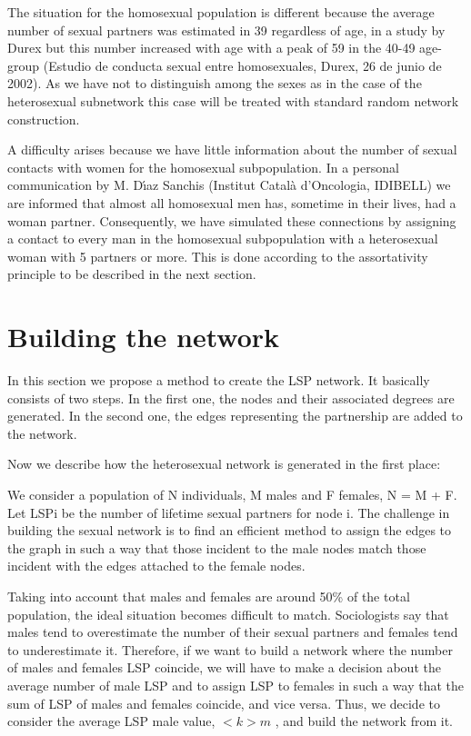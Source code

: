 The situation for the homosexual population is different because the average number of sexual partners was estimated in 39 regardless of age, in a study by Durex but this number increased with age with a peak of 59 in the 40-49 age-group (Estudio de conducta sexual entre homosexuales, Durex, 26 de junio de 2002).  As we have not to distinguish among the sexes as in the case of the heterosexual subnetwork this case will be treated with standard random network construction.

A difficulty arises because we have little information about the number of sexual contacts with women for the homosexual subpopulation. In a personal communication by M. D\'{\i}az Sanchis (Institut Catal\`{a} d'Oncologia, IDIBELL) we are informed that almost all homosexual men has, sometime in their lives, had a woman partner.  Consequently, we have simulated these connections by assigning a contact to every man in the homosexual subpopulation with a heterosexual woman with 5 partners or more. This is done according to the assortativity principle to be described in the next section.

\section{Building the network}

In this section we propose a method to create the LSP network. It basically
consists of two steps. In the first one, the nodes and their associated degrees are generated. In the second one, the edges representing the partnership are added to the network.

Now we describe how the heterosexual network is generated in the first place: 

We consider a population of N individuals, M males and F females, N = M + F. Let LSPi be the number of lifetime sexual partners for node i. The challenge in building the sexual network is to find an efficient method to assign the edges to the graph in such a way that those incident to the male nodes match those incident with the edges attached to the female nodes.

Taking into account that males and females are around 50\% of the total population, the ideal situation becomes difficult to match. Sociologists say that males tend to overestimate the number of their sexual partners and
females tend to underestimate it. Therefore, if we want to build a network
where the number of males and females LSP coincide, we will have to make a decision about the average number of male LSP and to assign LSP to females in such a way that the sum of LSP of males and females coincide, and vice versa. Thus, we decide to consider the average LSP male value, $<k>m$ , and build the network from it.

